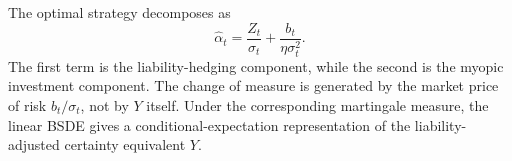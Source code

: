 \begin{remark}
The optimal strategy decomposes as
\[
\hat\alpha_t
=\frac{Z_t}{\sigma_t}
+\frac{b_t}{\eta\sigma_t^2}.
\]
The first term is the liability-hedging component, while the second is the myopic investment component. The change of measure is generated by the market price of risk \(b_t/\sigma_t\), not by \(Y\) itself. Under the corresponding martingale measure, the linear BSDE gives a conditional-expectation representation of the liability-adjusted certainty equivalent \(Y\).
\end{remark}
